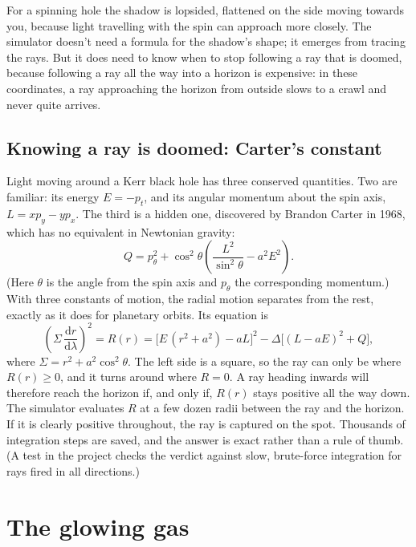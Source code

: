 \documentclass[11pt,a4paper]{article}
\newcommand{\dd}{\mathrm{d}}
\begin{document}
For a spinning hole the shadow is lopsided, flattened on the side moving towards you,
because light travelling with the spin can approach more closely. The simulator doesn't
need a formula for the shadow's shape; it emerges from tracing the rays. But it does need
to know when to stop following a ray that is doomed, because following a ray all the way
into a horizon is expensive: in these coordinates, a ray approaching the horizon from
outside slows to a crawl and never quite arrives.

\subsection{Knowing a ray is doomed: Carter's constant}

Light moving around a Kerr black hole has three conserved quantities. Two are familiar:
its energy $E = -p_t$, and its angular momentum about the spin axis, $L = x p_y - y p_x$.
The third is a hidden one, discovered by Brandon Carter in 1968, which has no equivalent in
Newtonian gravity:
\begin{equation}
  Q = p_\theta^2 + \cos^2\theta \left( \frac{L^2}{\sin^2\theta} - a^2 E^2 \right).
\end{equation}
(Here $\theta$ is the angle from the spin axis and $p_\theta$ the corresponding momentum.)
With three constants of motion, the radial motion separates from the rest, exactly as it
does for planetary orbits. Its equation is
\begin{equation}
  \left(\Sigma\, \frac{\dd r}{\dd\lambda}\right)^2 = R(r)
  = \big[E\,(r^2 + a^2) - aL\big]^2 - \Delta \big[(L - aE)^2 + Q\big] ,
\end{equation}
where $\Sigma = r^2 + a^2\cos^2\theta$. The left side is a square, so the ray can only be
where $R(r) \ge 0$, and it turns around where $R = 0$. A ray heading inwards will therefore
reach the horizon if, and only if, $R(r)$ stays positive all the way down. The simulator
evaluates $R$ at a few dozen radii between the ray and the horizon. If it is clearly
positive throughout, the ray is captured on the spot. Thousands of integration steps are
saved, and the answer is exact rather than a rule of thumb. (A test in the project checks
the verdict against slow, brute-force integration for rays fired in all directions.)

\section{The glowing gas}\label{sec:disk}
\end{document}
